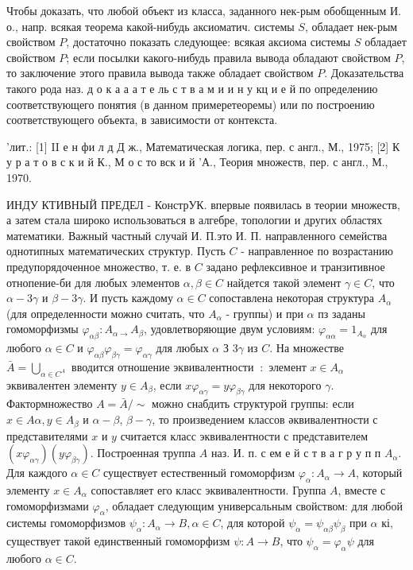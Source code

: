 \documentclass[10pt]{article}
\begin{document}
Чтобы доказать, что любой объект из класса, заданного нек-рым обобщенным И. о., напр. всякая теорема какой-нибудь аксиоматич. системы $S$, обладает нек-рым свойством $P$, достаточно показать следующее: всякая аксиома системы $S$ обладает свойством $P$; если посылки какого-нибудь правила вывода обладают свойством $P$, то заключение этого правила вывода также обладает свойством $P$. Доказательства такого рода наз. д о к а $а$ а т е ль с т в а м и и н у кц и е й по определению соответствующего понятия (в данном примеретеоремы) или по построению соответствующего объекта, в зависимости от контекста.



'лит.: [1] II е н фи л д Д ж., Математическая логика, пер. с англ., М., 1975; [2] К у р а т о в с к и й К., М о с то вск и й 'А., Теория множеств, пер. с англ., М., 1970.



ИНДУ КТИВНЫЙ ПРЕДЕЛ - КонстрУК. впервые появилась в теории множеств, а затем стала широко использоваться в алгебре, топологии и других областях математики. Важный частный случай И. П.это И. П. направленного семейства однотипных математических структур. Пусть $C$ - направленное по возрастанию предупорядоченное множество, т. е. в $C$ задано рефлексивное и транзитивное отнопение-би для любых элементов $\alpha, \beta \in C$ найдется такой элемент $\gamma \in C$, что $\alpha-3 \gamma$ и $\beta-3 \gamma$. И пусть каждому $\alpha \in C$ сопоставлена некоторая структура $A_{\alpha}$ (для определенности можно считать, что $A_{\alpha}$ - группы) и при $\alpha$ пз заданы гомоморфизмы $\varphi_{\alpha \beta}: A_{\alpha \rightarrow} A_{\beta}$, удовлетворяющие двум условиям: $\varphi_{\alpha \alpha}=1_{A_{\alpha}}$ для любого $\alpha \in C$ и $\varphi_{\alpha \beta} \varphi_{\beta \gamma}=\varphi_{\alpha \gamma}$ для любых $\alpha$ З $3 \gamma$ из $C$. На множестве $\bar{A}=\bigcup_{\alpha \in C^{A}}$ вводится отношение эквивалентности $~:$ элемент $x \in A_{\alpha}$ эквивалентен элементу $y \in A_{\beta}$, если $x \varphi_{\alpha \gamma}=y \varphi_{\beta \gamma}$ для некоторого $\gamma$. Фактормножество $A=\bar{A} / \sim$ можно снабдить структурой группы: если $x \in A \alpha, y \in A_{\beta}$ и $\alpha-\beta$, $\beta-\gamma$, то произведением классов әквивалентности с представителями $x$ и $y$ считается класс эквивалентности с представителем $\left(x \varphi_{\alpha \gamma}\right)\left(y \varphi_{\beta \gamma}\right)$. Построенная труппа $A$ наз. И. п. с ем е й с т в а г р у п п $A_{\alpha}$. Для каждого $\alpha \in C$ существует естественный гомоморфизм $\varphi_{\alpha}: A_{\alpha} \rightarrow A$, который элементу $x \in A_{\alpha}$ сопоставляет его класс эквивалентности. Группа $A$, вместе с гомоморфизмами $\varphi_{\alpha}$, обладает следующим универсальным свойством: для любой системы гомоморфизмов $\psi_{\alpha}: A_{\alpha} \rightarrow B, \alpha \in C$, для которой $\psi_{\alpha}=\psi_{\alpha \beta} \psi_{\beta}$ при $\alpha$ кі, существует такой единственный гомоморфизм $\psi: A \rightarrow B$, что $\psi_{\alpha}=\varphi_{\alpha} \psi$ для любого $\alpha \in C$.
\end{document}
